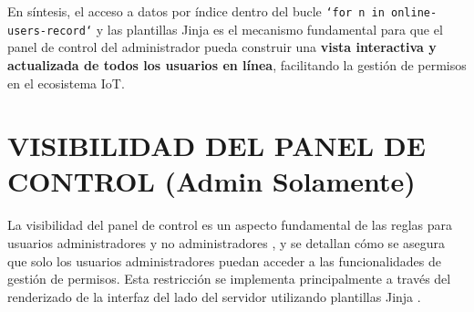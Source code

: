\documentclass{report}
\begin{document}
En síntesis, el acceso a datos por índice dentro del bucle \texttt{`for n in online-users-record`} y las plantillas Jinja es el mecanismo fundamental 
para que el panel de control del administrador pueda construir una \textbf{vista interactiva y actualizada de todos los usuarios en línea}, 
facilitando la gestión de permisos en el ecosistema IoT.

\section{VISIBILIDAD DEL PANEL DE CONTROL (Admin Solamente)}
La  visibilidad del panel de control  es un aspecto fundamental de las  reglas para usuarios administradores y no administradores , y se  
detallan cómo se asegura que  solo los usuarios administradores  puedan acceder a las funcionalidades de gestión de permisos. Esta restricción se 
implementa principalmente a través del  renderizado de la interfaz del lado del servidor utilizando plantillas Jinja .
\end{document}
